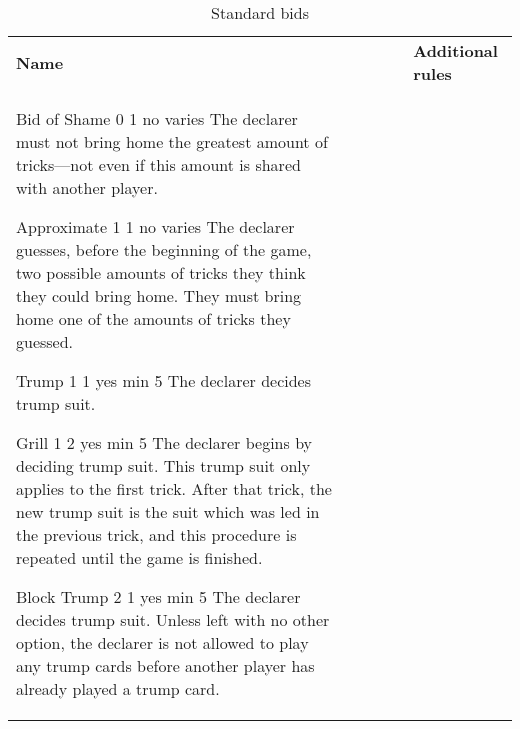 %
%
%
%

\begin{table}
	\caption{Standard bids}\label{tab:standardBids}
	\begin{center}
		\begin{tabularx}{\textwidth}{
			l
			S[table-number-alignment=center, table-format=1.0]
			S[table-number-alignment=center, table-format=1.0]
			cc|X
		}
				\textbf{Name} &
				 &
				 &
				 &
				 &
				\textbf{Additional rules}
				\\[-3ex]

				\standardBidItem%
				{Bid of Shame}
				{0}
				{1}
				{no}
				{varies}
				{%
					The declarer must not bring home the greatest amount of tricks---not even if this amount is shared with another player.
				}

				\standardBidItem%
				{Approximate}
				{1}
				{1}
				{no}
				{varies}
				{%
					The declarer guesses, before the beginning of the game, two possible amounts of tricks they think they could bring home. They must bring home one of the amounts of tricks they guessed.
				}

				\standardBidItem%
				{Trump}
				{1}
				{1}
				{yes}
				{min 5}
				{%
					The declarer decides trump suit.
				}

				\standardBidItem%
				{Grill}
				{1}
				{2}
				{yes}
				{min 5}
				{%
					The declarer begins by deciding trump suit. This trump suit only applies to the first trick. After that trick, the new trump suit is the suit which was led in the previous trick, and this procedure is repeated until the game is finished.
				}

				\standardBidItem%
				{Block Trump}
				{2}
				{1}
				{yes}
				{min 5}
				{%
					The declarer decides trump suit. Unless left with no other option, the declarer is not allowed to play any trump cards before another player has already played a trump card.
				}
				

\end{tabularx}
\end{center}
\end{table}
